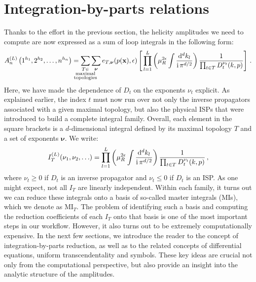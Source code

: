 \documentclass[main.tex]{subfiles}
\begin{document}
\section{Integration-by-parts relations} \label{sec:IBP}
Thanks to the effort in the previous section, the helicity amplitudes we need to compute are now expressed as a sum of loop integrals in the following form:
\begin{equation} \label{eq:ampreducedschematic}
    	A_n^{(L)} \left(1^{h_1}, 2^{h_2}, \ldots, n^{h_n} \right) =  
     \sum_{\mathclap{\substack{T \in \\ \text{maximal} \\ \text{topologies}}}} \sum_{\bm{\nu}} e_{T, \bm{\nu}}(p(\mathbf{x}), \eps) \left[\, \prod_{l=1}^{L} 
     \left( \mu_R^{2\eps} \int \frac{\dd^d k_l}{\ii \, \pi^{d/2}}\right)
 \frac{1}{\prod_{t\in T} D^{\nu_t}_t(k,p)} \right]\,.
\end{equation}
Here, we have made the dependence of $D_t$ on the exponents $\nu_t$ explicit. As explained earlier, the index $t$ must now run over not only the inverse propagators associated with a given maximal topology, but also the physical ISPs that were introduced to build a complete integral family. Overall, each element in the square brackets is a $d$-dimensional integral defined by its maximal topology $T$ and a set of exponents $\bm{\nu}$. We write:
\begin{equation} \label{eq:ibpintegral}
    I_T^{(L)}(\nu_1, \nu_2, \ldots) = \prod_{l=1}^{L} 
     \left( \mu_R^{2\epsilon} \int \frac{\mathrm{d}^d k_l}{\mathrm{i} \, \pi^{d/2}}\right)
 \frac{1}{\prod_{t\in T} D^{\nu_t}_t(k,p)}\,,
\end{equation}
where $\nu_t \geq 0$ if $D_t$ is an inverse propagator and $\nu_t\le0$ if $D_t$ is an ISP. As one might expect, not all $I_T$ are linearly independent. Within each family, it turns out we can reduce these integrals onto a basis of so-called master integrals (MIs), which we denote as $\text{MI}_T$. The problem of identifying such a basis and computing the reduction coefficients of each $I_T$ onto that basis is one of the most important steps in our workflow. However, it also turns out to be extremely computationally expensive. In the next few sections, we introduce the reader to the concept of integration-by-parts reduction, as well as to the related concepts of differential equations, uniform transcendentality and symbols. These key ideas are crucial not only from the computational perspective, but also provide an insight into the analytic structure of the amplitudes.
\end{document}
